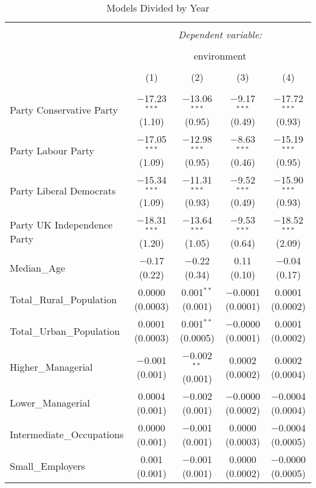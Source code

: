 \documentclass[12pt,letterpaper]{article}
\begin{document}
\begin{table}[!htbp] \centering 
	\caption{Models Divided by Year} 
	\label{} 
	\footnotesize 
	\begin{adjustbox}{width=\textwidth}
		\begin{tabular}{@{\extracolsep{5pt}}lcccc} 
			\\[-1.8ex]\hline 
			\hline \\[-1.8ex] 
			& \multicolumn{4}{c}{\textit{Dependent variable:}} \\ 
			\cline{2-5} 
			\\[-1.8ex] & \multicolumn{4}{c}{environment} \\ 
			\\[-1.8ex] & (1) & (2) & (3) & (4)\\ 
			\hline \\[-1.8ex] 
			Party Conservative Party & $-$17.23$^{***}$ (1.10) & $-$13.06$^{***}$ (0.95) & $-$9.17$^{***}$ (0.49) & $-$17.72$^{***}$ (0.93) \\ 
			Party Labour Party & $-$17.05$^{***}$ (1.09) & $-$12.98$^{***}$ (0.95) & $-$8.63$^{***}$ (0.46) & $-$15.19$^{***}$ (0.95) \\ 
			Party Liberal Democrats & $-$15.34$^{***}$ (1.09) & $-$11.31$^{***}$ (0.93) & $-$9.52$^{***}$ (0.49) & $-$15.90$^{***}$ (0.93) \\ 
			Party UK Independence Party & $-$18.31$^{***}$ (1.20) & $-$13.64$^{***}$ (1.05) & $-$9.53$^{***}$ (0.64) & $-$18.52$^{***}$ (2.09) \\ 
			Median\_Age & $-$0.17 (0.22) & $-$0.22 (0.34) & 0.11 (0.10) & $-$0.04 (0.17) \\ 
			Total\_Rural\_Population & 0.0000 (0.0003) & 0.001$^{**}$ (0.001) & $-$0.0001 (0.0001) & 0.0001 (0.0002) \\ 
			Total\_Urban\_Population & 0.0001 (0.0003) & 0.001$^{**}$ (0.0005) & $-$0.0000 (0.0001) & 0.0001 (0.0002) \\ 
			Higher\_Managerial & $-$0.001 (0.001) & $-$0.002$^{**}$ (0.001) & 0.0002 (0.0002) & 0.0002 (0.0004) \\ 
			Lower\_Managerial & 0.0004 (0.001) & $-$0.002 (0.001) & $-$0.0000 (0.0002) & $-$0.0004 (0.0004) \\ 
			Intermediate\_Occupations & 0.0000 (0.001) & $-$0.001 (0.001) & 0.0000 (0.0003) & $-$0.0004 (0.0005) \\ 
			Small\_Employers & 0.001 (0.001) & $-$0.001 (0.001) & 0.0000 (0.0002) & $-$0.0000 (0.0005) \\ 

\end{tabular}
\end{adjustbox}
\end{table}
\end{document}
